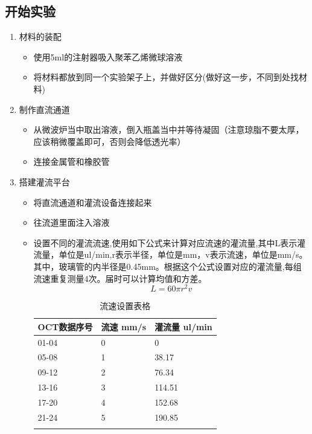 \documentclass[12pt]{article}
\begin{document}
\subsection{开始实验}
\begin{enumerate}
    \item 材料的装配
    \begin{itemize}
        \item 使用5ml的注射器吸入聚苯乙烯微球溶液
        \item 将材料都放到同一个实验架子上，并做好区分(做好这一步，不同到处找材料)
    \end{itemize}

    \item 制作直流通道
    \begin{itemize}
        \item 从微波炉当中取出溶液，倒入瓶盖当中并等待凝固（注意琼脂不要太厚，应该稍微覆盖即可，否则会降低透光率）
        \item 连接金属管和橡胶管
    \end{itemize}

    \item 搭建灌流平台
    \begin{itemize}
        \item 将直流通道和灌流设备连接起来
        \item 往流道里面注入溶液
        \item 设置不同的灌流流速,使用如下公式来计算对应流速的灌流量,其中L表示灌流量，单位是ul/min,r表示半径，单位是mm，v表示流速，单位是mm/s。其中，玻璃管的内半径是0.45mm。根据这个公式设置对应的灌流量,每组流速重复测量4次。届时可以计算均值和方差。
        \begin{equation}
            L=60 \pi r^2 v
        \end{equation}

        \footnotesize
        \begin{longtable}{@{} p{5cm} p{5cm} p{5cm} @{}}
            \toprule
            \textbf{OCT数据序号} & \textbf{流速 mm/s} & \textbf{灌流量 ul/min} \\ 
            \midrule
            01-04 & 0 & 0 \\
            05-08 & 1 & 38.17 \\
            09-12 & 2 & 76.34 \\
            13-16 & 3 & 114.51 \\
            17-20 & 4 & 152.68 \\
            21-24 & 5 & 190.85 \\
            \bottomrule
            \caption{流速设置表格} \\
        \end{longtable}
    \end{itemize}


\end{enumerate}
\end{document}
